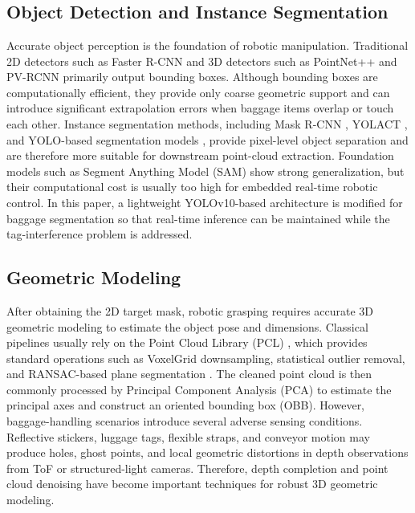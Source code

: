 \section{}
\subsection{Object Detection and Instance Segmentation}
Accurate object perception is the foundation of robotic manipulation. Traditional 2D detectors such as Faster R-CNN \cite{ren2015faster} and 3D detectors such as PointNet++ \cite{qi2017pointnet++} and PV-RCNN \cite{shi2020pv} primarily output bounding boxes. Although bounding boxes are computationally efficient, they provide only coarse geometric support and can introduce significant extrapolation errors when baggage items overlap or touch each other. Instance segmentation methods, including Mask R-CNN \cite{he2017mask}, YOLACT \cite{bolya2019yolact}, and YOLO-based segmentation models \cite{Jocher_Ultralytics_YOLO26_Unified_2026}, provide pixel-level object separation and are therefore more suitable for downstream point-cloud extraction. Foundation models such as Segment Anything Model (SAM) \cite{kirillov2023segment} show strong generalization, but their computational cost is usually too high for embedded real-time robotic control. In this paper, a lightweight YOLOv10-based architecture is modified for baggage segmentation so that real-time inference can be maintained while the tag-interference problem is addressed.

\subsection{Geometric Modeling}

After obtaining the 2D target mask, robotic grasping requires accurate 3D geometric modeling to estimate the object pose and dimensions. Classical pipelines usually rely on the Point Cloud Library (PCL) \cite{rusu20113d}, which provides standard operations such as VoxelGrid downsampling, statistical outlier removal, and RANSAC-based plane segmentation \cite{fischler1981random}. The cleaned point cloud is then commonly processed by Principal Component Analysis (PCA) to estimate the principal axes and construct an oriented bounding box (OBB). However, baggage-handling scenarios introduce several adverse sensing conditions. Reflective stickers, luggage tags, flexible straps, and conveyor motion may produce holes, ghost points, and local geometric distortions in depth observations from ToF or structured-light cameras. Therefore, depth completion and point cloud denoising have become important techniques for robust 3D geometric modeling.

